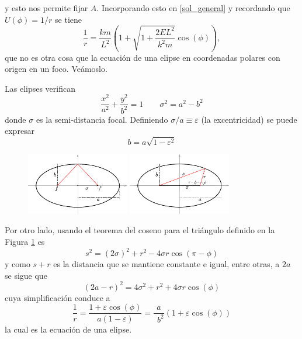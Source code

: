 \documentclass[10pt,oneside]{CBFT_book}
\begin{document}
y esto nos permite fijar $A$. Incorporando esto en \eqref{sol_general} y recordando que $U(\phi) =1/r$ 
se tiene 
\[
	\frac{1}{r} = \frac{km}{L^2}\left( 1 +  \sqrt{1 + \frac{2EL^2}{k^2 m} } \cos( \phi ) \right),
\]
que no es otra cosa que la ecuación de una elipse en coordenadas polares con origen en un foco.
Veámoslo.


Las elipses verifican 
\[
	\frac{x^2}{a^2} + \frac{y^2}{b^2} = 1	\qquad \sigma^2 = a^2 - b^2
\]
donde $\sigma$ es la semi-distancia focal. Definiendo $ \sigma/a \equiv \varepsilon$ (la excentricidad) 
se puede expresar
\[
	b = a \sqrt{ 1 - \varepsilon^2 }
\]
\begin{figure}[hbt]
	\begin{center}
	\includegraphics[width=0.4\textwidth]{images/fig_mc_elipse_1.pdf} \hspace*{2em}	 
	\includegraphics[width=0.4\textwidth]{images/fig_mc_elipse.pdf}	 
	\end{center}
	\caption{}
	\label{fig_mc_elipse}
\end{figure} 

Por otro lado, usando el teorema del coseno para el triángulo definido en la Figura \ref{fig_mc_elipse} es 
\[
	s^2 = (2\sigma)^2 + r^2 - 4\sigma r \cos( \pi - \phi )
\]
y como $s+r$ es la distancia que se mantiene constante e igual, entre otras, a $2a$ se sigue que 
\[
	( 2a -r )^2 = 4\sigma^2 + r^2 + 4\sigma r \cos(\phi)
\]
cuya simplificación conduce a
\[
	\frac{1}{r} = \frac{1 + \varepsilon \cos (\phi)}{a(1-\varepsilon)} = \frac{a}{\phantom{^a}b^2} \left( 1 + \varepsilon \cos (\phi) \right)
\]
la cual es la ecuación de una elipse.
\end{document}
